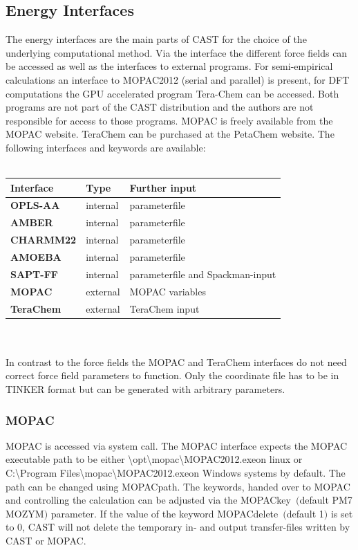 \documentclass[10pt,a4paper]{article} %
\begin{document}
{	%
	\subsection{Energy Interfaces}
	The energy interfaces are the main parts of CAST for the choice of the underlying computational method. Via the interface the different force fields can be accessed as well as the interfaces to external programs. For semi-empirical calculations an interface to MOPAC2012 (serial\supercite{mopac} and parallel\supercite{mopac_parallel}) is present, for DFT computations the GPU accelerated program Tera-Chem can be accessed. Both programs are not part of the CAST distribution and the authors are not responsible for access to those programs. MOPAC is freely available from the MOPAC website. TeraChem\supercite{terachem} can be purchased at the PetaChem website.
	The following interfaces and keywords are available:\\~\\
	\begin{tabularx}{\textwidth}{l|l|l}
		Interface & Type & Further input \\
		\hline
		\textbf{OPLS-AA} & internal & parameterfile \\
		\textbf{AMBER} & internal & parameterfile \\
		\textbf{CHARMM22} & internal & parameterfile \\
		\textbf{AMOEBA} & internal & parameterfile\\
		\textbf{SAPT-FF} & internal &parameterfile and Spackman-input\\
		\textbf{MOPAC} & external & MOPAC variables\\
		\textbf{TeraChem} & external & TeraChem input\\
	\end{tabularx}	\\~\\
	In contrast to the force fields the MOPAC and TeraChem interfaces do not need correct force field parameters to function. Only the coordinate file has to be in TINKER format but can be generated with arbitrary parameters.
		\subsubsection{MOPAC}
		MOPAC is accessed via system call. The MOPAC interface expects the MOPAC executable path to be either \glqq \textbackslash opt\textbackslash mopac\textbackslash MOPAC2012.exe\grqq on linux or \glqq C:\textbackslash Program Files\textbackslash mopac\textbackslash MOPAC2012.exe\grqq on Windows systems by default. The path can be changed using \glqq MOPACpath\grqq.
		The keywords, handed over to MOPAC and controlling the calculation can be adjusted via the \glqq MOPACkey\grqq \ $($default \glqq PM7 MOZYM\grqq$)$ parameter.
		If the value of the keyword \glqq MOPACdelete\grqq \ $($default 1$)$ is set to 0, CAST will not delete the temporary in- and output transfer-files written by CAST or MOPAC.

}
\end{document}
